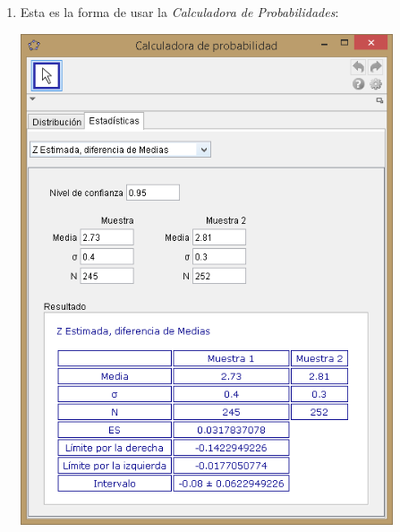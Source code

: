 \documentclass[10pt,a4paper]{article}\usepackage[]{graphicx}\usepackage[]{color}
\begin{document}
{\begin{enumerate}
  \item Esta es la forma de usar la {\em Calculadora de Probabilidades}:
    \begin{center}
    \includegraphics[width=11cm]{../fig/Tut09-09.png}
    \end{center}


\end{enumerate}}
\end{document}
